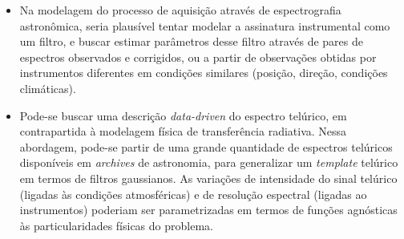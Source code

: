 \begin{itemize}
\item Na modelagem do processo de aquisição através de espectrografia astronômica, seria plausível tentar modelar a assinatura instrumental como um filtro, e buscar estimar parâmetros desse filtro através de pares de espectros observados e corrigidos, ou a partir de observações obtidas por instrumentos diferentes em condições similares (posição, direção, condições climáticas).%

\item Pode-se buscar uma descrição \textit{data-driven} do espectro telúrico, em contrapartida à modelagem física de transferência radiativa. Nessa abordagem, pode-se partir de uma grande quantidade de espectros telúricos disponíveis em \textit{archives} de astronomia, para generalizar um \textit{template} telúrico em termos de filtros gaussianos. As variações de intensidade do sinal telúrico (ligadas às condições atmosféricas) e de resolução espectral (ligadas ao instrumentos) poderiam ser parametrizadas em termos de funções agnósticas às particularidades físicas do problema.




\end{itemize}
